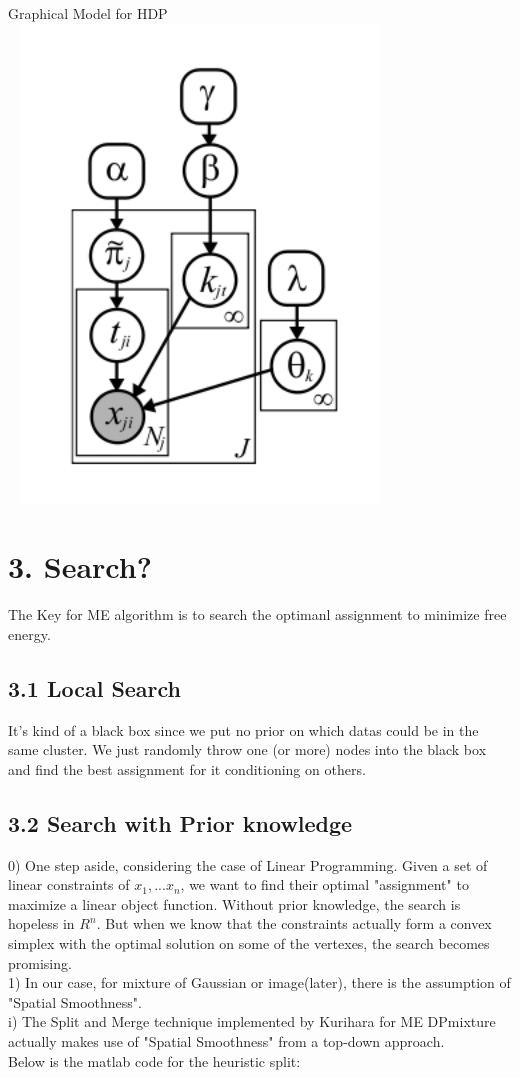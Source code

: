 \documentclass{article}
\begin{document}
\begin{spacing}{1.1}
\begin{center}
Graphical Model for HDP\\
    \includegraphics[width=4in,height=5in]{hdp.jpg} 
\end{center}



\section*{3. Search?}
The Key for ME algorithm is to search the optimanl assignment to minimize free energy.\\
\subsection*{3.1 Local Search}
It's kind of a black box since we put no prior on which datas could be in the same cluster. We just randomly throw one (or more) nodes into the black box 
and find the best assignment for it conditioning on others.
\subsection*{3.2 Search with Prior knowledge}
0) One step aside, considering the case of Linear Programming. Given a set of linear constraints of $x_{1},...x_{n}$, we want to find their
optimal "assignment" to maximize a linear object function. Without prior knowledge, the search is hopeless in $R^{n}$. But when we know that the constraints 
actually form a convex simplex with the optimal solution on some of the vertexes, the search becomes promising.\\
1) In our case, for mixture of Gaussian or image(later), there is the assumption of "Spatial Smoothness". \\
i) The Split and Merge technique implemented by Kurihara for ME DPmixture actually makes use of "Spatial Smoothness" from a top-down approach.
\\ Below is the matlab code for the heuristic split:\\


\end{spacing}
\end{document}
